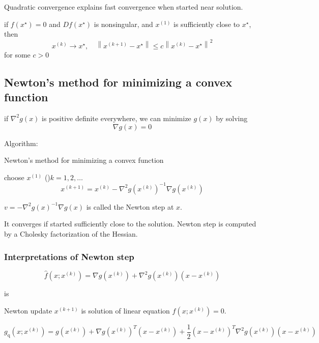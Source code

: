 Quadratic convergence explains fast convergence when started near solution.

\begin{theorem}
    if $ f\left(x^{\star}\right)=0 $ and $ D f\left(x^{\star}\right) $ is nonsingular, and $ x^{(1)} $ is sufficiently close to $ x^{\star} $, then
$$
x^{(k)} \rightarrow x^{\star}, \quad\left\|x^{(k+1)}-x^{\star}\right\| \leq c\left\|x^{(k)}-x^{\star}\right\|^{2}
$$
for some $ c>0 $
\end{theorem}

\subsection{Newton's method for minimizing a convex function}

if $ \nabla^{2} g(x) $ is positive definite everywhere, we can minimize $ g(x) $ by solving
$$
\nabla g(x)=0
$$


Algorithm:
\begin{algorithm}[htbp]
    \caption{Newton's method for minimizing a convex function}
    choose $ x^{(1)} $\;
    \While(){$ k=1,2, \ldots $}{
        $$
x^{(k+1)}=x^{(k)}-\nabla^{2} g\left(x^{(k)}\right)^{-1} \nabla g\left(x^{(k)}\right)
$$\;
    }
\end{algorithm}

$ v=-\nabla^{2} g(x)^{-1} \nabla g(x) $ is called the Newton step at $ x $.

It converges if started sufficiently close to the solution. Newton step is computed by a Cholesky factorization of the Hessian.

\subsubsection{Interpretations of Newton step}


\begin{definition}[affine approximation of $ f(x)=\nabla g(x) $ around $ x^{(k)} $]
    $$
\hat{f}\left(x ; x^{(k)}\right)=\nabla g\left(x^{(k)}\right)+\nabla^{2} g\left(x^{(k)}\right)\left(x-x^{(k)}\right)
$$
\end{definition} is

Newton update $ x^{(k+1)} $ is solution of linear equation $ \hat{f}\left(x ; x^{(k)}\right)=0 $.

\begin{definition}
    $$
g_{\mathrm{q}}\left(x ; x^{(k)}\right)=g\left(x^{(k)}\right)+\nabla g\left(x^{(k)}\right)^{T}\left(x-x^{(k)}\right)+\frac{1}{2}\left(x-x^{(k)}\right)^{T} \nabla^{2} g\left(x^{(k)}\right)\left(x-x^{(k)}\right)
$$
\end{definition}

